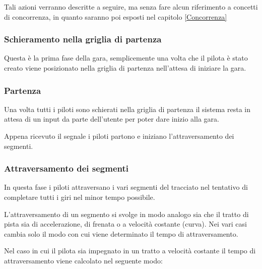 \documentclass[a4paper,11pt, twoside, openright]{book}
\begin{document}
	Tali azioni verranno descritte a seguire, ma senza fare alcun riferimento a concetti
	di concorrenza, in quanto saranno poi esposti nel capitolo \ref{Concorrenza}

	\subsubsection{Schieramento nella griglia di partenza}
	  Questa è la prima fase della gara, semplicemente una volta che il pilota è stato creato
	  viene posizionato nella griglia di partenza nell'attesa di iniziare la gara.
	  
	\subsubsection{Partenza}
	
	  Una volta tutti i piloti sono schierati nella griglia di partenza il sistema resta in attesa di un input
	  da parte dell'utente per poter dare inizio alla gara.
	  
	  Appena ricevuto il segnale i piloti partono e iniziano l'attraversamento dei segmenti.
	  
	\subsubsection{Attraversamento dei segmenti}
	\label{AttraversamentoSegmenti}
	  In questa fase i piloti attraversano i vari segmenti del tracciato nel tentativo di completare tutti i giri
	  nel minor tempo possibile.
	  
	  L'attraversamento di un segmento si svolge in modo analogo sia che il tratto di pista sia
	  di accelerazione, di frenata o a velocità costante (curva). Nei vari casi cambia solo il modo con cui viene 
	  determinato il tempo di attraversamento.
	  
	  Nel caso in cui il pilota sia impegnato in un tratto a velocità costante
	  il tempo di attraversamento viene calcolato nel seguente modo:
	  
\end{document}
